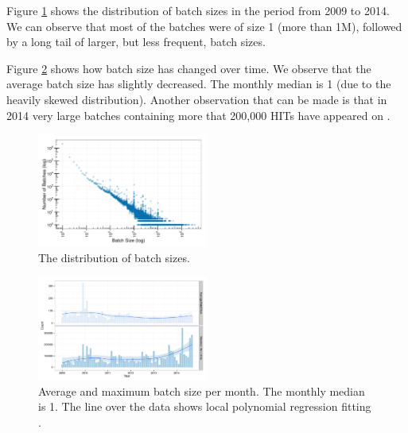 Figure \ref{fig:batch_size_pow} shows the distribution of batch sizes in the period from 2009 to 2014. We can observe that most of the batches were of size 1 (more than 1M), followed by a long tail of larger, but less frequent, batch sizes.

Figure \ref{fig:batch_size} shows how batch size has changed over time. We observe that the average batch size has slightly decreased. The monthly median is 1 (due to the heavily skewed distribution). Another observation that can be made is that in 2014 very large batches containing more that 200,000 HITs have appeared on \amt{}.

\begin{figure}[tb]
	\centering
		\includegraphics[width=0.5\textwidth]{figures/powerlaw}
	\caption{The distribution of batch sizes.}
	\label{fig:batch_size_pow}
\end{figure}

\begin{figure}[tb]
	\centering
		\includegraphics[width=0.5\textwidth]{figures/batch_size}
	\caption{Average and maximum batch size per month. The monthly median is 1. The line over the data shows local polynomial regression fitting \cite{cleveland1992local}.}
	\label{fig:batch_size}
\end{figure}


